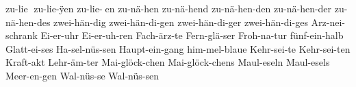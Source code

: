 {  zu-lie^^Y
  zu-lie-^^ffen %
  zu-lie-^^Yen
  zu-n^^e4-hen %
  zu-n^^e4-hend %
  zu-n^^e4-hen-den %
  zu-n^^e4-hen-der %
  zu-n^^e4-hen-des %
  zwei-h^^e4n-dig %
  zwei-h^^e4n-di-gen %
  zwei-h^^e4n-di-ger %
  zwei-h^^e4n-di-ges %
%
%
%
  Arz-nei-schrank %
  Ei-er-uhr %
  Ei-er-uh-ren %
  Fach-^^e4rz-te %
  Fern-gl^^e4-ser %
  Froh-na-tur %
  f^^fcnf-ein-halb %
  Glatt-ei-ses %
  Ha-sel-n^^fcs-sen %
  Haupt-ein-gang %
  him-mel-blaue %
  Kehr-sei-te %
  Kehr-sei-ten %
  Kraft-akt %
  Lehr-^^e4m-ter %
  Mai-gl^^f6ck-chen %
  Mai-gl^^f6ck-chens %
  Maul-eseln %
  Maul-esels %
  Meer-en-gen %
  Wal-n^^fcs-se %
  Wal-n^^fcs-sen %
}

\endgroup

\endinput

